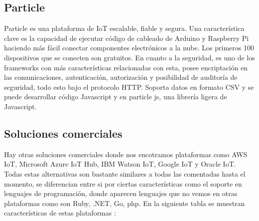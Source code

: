 {\subsection{Particle}

Particle es una plataforma de IoT escalable, fiable y segura. Una característica clave es la capacidad de ejecutar código de cableado de Arduino y Raspberry Pi haciendo más fácil conectar componentes electrónicos a la nube. Los primeros 100 dispositivos que se conecten son gratuitos. En cuanto a la seguridad, es uno de los frameworks con más características relacionadas con esta, posee encriptación en las comunicaciones, autenticación, autorización y posibilidad de auditoría de seguridad, todo esto bajo el protocolo HTTP. Soporta datos en formato CSV y se puede desarrollar código Javascript y en particle js, una librería ligera de Javascript.

\subsection{Soluciones comerciales}

Hay otras soluciones comerciales donde nos encotramos plataformas como AWS IoT, Microsoft Azure IoT Hub, IBM Watson IoT, Google IoT y Oracle IoT. Todas estas alternativas son bastante similares a todas las comentadas hasta el momento, se diferencian entre si por ciertas características como el soporte en lenguajes de programación, donde aparecen lenguajes que no vemos en otras plataformas como son Ruby, .NET, Go, php. En la siguiente tabla se muestran características de estas plataformas : 


}

